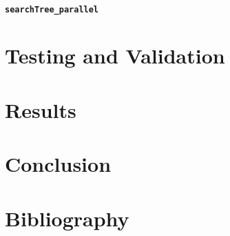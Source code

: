 \documentclass{article}
\begin{document}
\paragraph{\texttt{searchTree\_parallel}}



\section{Testing and Validation}



\section{Results}



\section{Conclusion}



\section{Bibliography}
\end{document}
